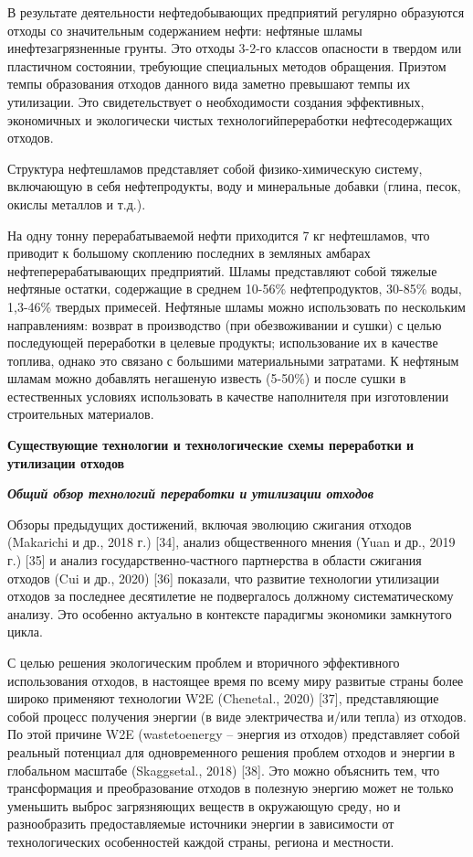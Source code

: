 \begin{multicols}{2}
В результате деятельности нефтедобывающих предприятий регулярно
образуются отходы со значительным содержанием нефти: нефтяные шламы
инефтезагрязненные грунты. Это отходы 3-2-го классов опасности в твердом
или пластичном состоянии, требующие специальных методов обращения.
Приэтом темпы образования отходов данного вида заметно превышают темпы
их утилизации. Это свидетельствует о необходимости создания эффективных,
экономичных и экологически чистых технологийпереработки нефтесодержащих
отходов.

Структура нефтешламов представляет собой физико-химическую систему,
включающую в себя нефтепродукты, воду и минеральные добавки (глина,
песок, окислы металлов и т.д.).

На одну тонну перерабатываемой нефти приходится 7 кг нефтешламов, что
приводит к большому скоплению последних в земляных амбарах
нефтеперерабатывающих предприятий. Шламы представляют собой тяжелые
нефтяные остатки, содержащие в среднем 10-56\% нефтепродуктов, 30-85\%
воды, 1,3-46\% твердых примесей. Нефтяные шламы можно использовать по
нескольким направлениям: возврат в производство (при обезвоживании и
сушки) с целью последующей переработки в целевые продукты; использование
их в качестве топлива, однако это связано с большими материальными
затратами. К нефтяным шламам можно добавлять негашеную известь (5-50\%)
и после сушки в естественных условиях использовать в качестве
наполнителя при изготовлении строительных материалов.

{\bfseries Существующие технологии и технологические схемы переработки и
утилизации отходов}

\emph{{\bfseries Общий обзор технологий переработки и утилизации отходов}}

Обзоры предыдущих достижений, включая эволюцию сжигания отходов
(Makarichi и др., 2018 г.) {[}34{]}, анализ общественного мнения (Yuan и
др., 2019 г.) {[}35{]} и анализ государственно-частного партнерства в
области сжигания отходов (Cui и др., 2020) {[}36{]} показали, что
развитие технологии утилизации отходов за последнее десятилетие не
подвергалось должному систематическому анализу. Это особенно актуально в
контексте парадигмы экономики замкнутого цикла.

С целью решения экологическим проблем и вторичного эффективного
использования отходов, в настоящее время по всему миру развитые страны
более широко применяют технологии W2E (Chenetal., 2020) {[}37{]},
представляющие собой процесс получения энергии (в виде электричества
и/или тепла) из отходов. По этой причине W2E (wastetoenergy -- энергия
из отходов) представляет собой реальный потенциал для одновременного
решения проблем отходов и энергии в глобальном масштабе (Skaggsetal.,
2018) {[}38{]}. Это можно объяснить тем, что трансформация и
преобразование отходов в полезную энергию может не только уменьшить
выброс загрязняющих веществ в окружающую среду, но и разнообразить
предоставляемые источники энергии в зависимости от технологических
особенностей каждой страны, региона и местности.


\end{multicols}
